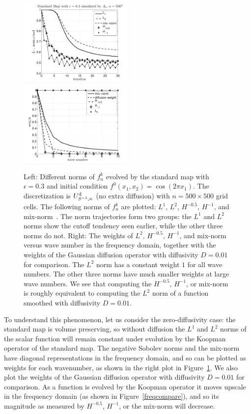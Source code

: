 \documentclass{aims}
\theoremstyle{definition}
\begin{document}
\begin{figure}
  \centerline{
    \includegraphics[width=0.5\textwidth,trim=0 0 0 22,clip=true]{normcompareplot}
    \includegraphics[width=0.5\textwidth]{normcompareweighting}
  }
  \caption{\label{normcompare} Left: Different norms of $f_n^k$
    evolved by the standard map with $\epsilon=0.3$ and initial
    condition $f^0(x_1,x_2)= \cos(2\pi x_1)$. The discretization is
    $U_{S^{-1},n}^{\rm d}$ (no extra diffusion) with $n=500 \times
    500$ grid cells. The following norms of $f_n^k$ are plotted:
    $L^1$, $L^2$, $H^{-0.5}$, $H^{-1}$, and
    mix-norm~\cite{Mezic2005}. The norm trajectories form two groups:
    the $L^1$ and $L^2$ norms show the cutoff tendency seen earlier,
    while the other three norms do not.  Right: The weights of $L^2$,
    $H^{-0.5}$, $H^{-1}$, and mix-norm versus wave number in the
    frequency domain, together with the weights of the Gaussian
    diffusion operator with diffusivity $D = 0.01$ for comparison. The
    $L^2$ norm has a constant weight $1$ for all wave numbers. The
    other three norms have much smaller weights at large wave
    numbers. We see that computing the $H^{-0.5}$, $H^{-1}$, or
    mix-norm is roughly equivalent to computing the $L^2$ norm of a
    function smoothed with diffusivity $D = 0.01$.}
\end{figure}

To understand this phenomenon, let us consider the zero-diffusivity
case: the standard map is volume preserving, so without diffusion the
$L^1$ and $L^2$ norms of the scalar function will remain constant
under evolution by the Koopman operator of the standard map. The
negative Sobolev norms and the mix-norm have diagonal representations
in the frequency domain, and so can be plotted as weights for each
wavenumber, as shown in the right plot in Figure~\ref{normcompare}. We
also plot the weights of the Gaussian diffusion operator with
diffusivity $D = 0.01$ for comparison. As a function is evolved by the
Koopman operator it moves upscale in the frequency domain (as shown in
Figure~\ref{freqcompare}), and so its magnitude as measured by
$H^{-0.5}$, $H^{-1}$, or the mix-norm will decrease.
\end{document}
